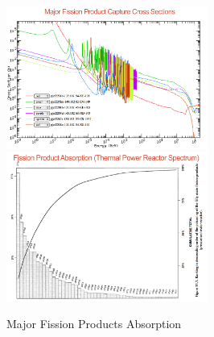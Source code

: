 \documentclass{school-22.211-notes}
\begin{document}
\begin{figure}
  \centering
  \includegraphics[width=0.59\textwidth]{images/dfs/fission-product-capture-xs.png}
  \includegraphics[width=0.59\textwidth]{images/dfs/fission-product-absorption.png}
  \caption{Major Fission Products Absorption} \label{major-capture} 
\end{figure}
\end{document}
